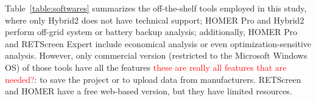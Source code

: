 \documentclass[journal]{IEEEtran}
\begin{document}


Table~\ref{table:softwares} summarizes the off-the-shelf tools employed in this study, where only Hybrid2 does not have technical support; HOMER Pro and Hybrid2 perform off-grid system or battery backup analysis; %
additionally, HOMER Pro and RETScreen Expert include economical analysis or even optimization-sensitive analysis. However, only commercial version (restricted to the Microsoft Windows OS) of those tools have all the features \textcolor{red}{these are really all features that are needed?}: to save the project or to upload data from manufacturers. RETScreen and HOMER have a free web-based version, but they have limited resources.
\end{document}
